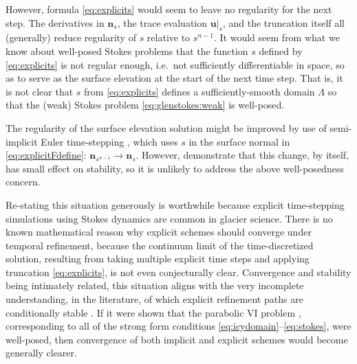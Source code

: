 \documentclass[hidelinks,onefignum,onetabnum,final]{siamart220329}  %
\newcommand{\bn}{\mathbf{n}}
\newcommand{\bu}{\mathbf{u}}
\begin{document}
However, formula \eqref{eq:explicits} would seem to leave no regularity for the next step.  The derivatives in $\bn_{s}$, the trace evaluation $\bu|_{s}$, and the truncation itself all (generally) reduce regularity of $s$ relative to $s^{n-1}$.  It would seem from what we know about well-posed Stokes problems that the function $s$ defined by \eqref{eq:explicits} is not regular enough, i.e.~not sufficiently differentiable in space, so as to serve as the surface elevation at the start of the next time step.  That is, it is not clear that $s$ from \eqref{eq:explicits} defines a sufficiently-smooth domain $\Lambda$ so that the (weak) Stokes problem \eqref{eq:glenstokes:weak} is well-posed.

The regularity of the surface elevation solution might be improved by use of semi-implicit Euler time-stepping  \cite{LofgrenAhlkronaHelanow2022}, which uses $s$ in the surface normal in \eqref{eq:explicitFdefine}: $\bn_{s^{n-1}} \to \bn_s$.  However, \cite{LofgrenAhlkronaHelanow2022} demonstrate that this change, by itself, has small effect on stability, so it is unlikely to address the above well-posedness concern.

Re-stating this situation generously is worthwhile because explicit time-stepping simulations using Stokes dynamics are common in glacier science.  There is no known mathematical reason why explicit schemes should converge under temporal refinement, because the continuum limit of the time-discretized solution, resulting from taking multiple explicit time steps and applying truncation \eqref{eq:explicits}, is not even conjecturally clear.  Convergence and stability being intimately related, this situation aligns with the very incomplete understanding, in the literature, of which explicit refinement paths are conditionally stable \cite[and references therein]{Bueler2023,Chengetal2017,LofgrenAhlkronaHelanow2022}.  If it were shown that the parabolic  VI problem \cite{Glowinski1984}, corresponding to all of the strong form conditions \eqref{eq:icydomain}--\eqref{eq:stokes}, were well-posed, then convergence of both implicit and explicit schemes would become generally clearer.
\end{document}
